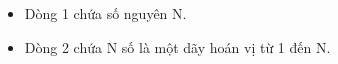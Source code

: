 \begin{itemize}
	\item Dòng 1 chứa số nguyên N.
	\item Dòng 2 chứa N số là một dãy hoán vị từ 1 đến N.
\end{itemize}